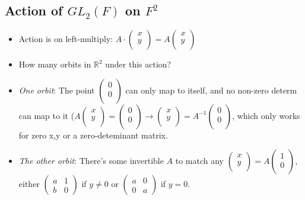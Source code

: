 \documentclass[11pt, oneside]{article}   	%
\begin{document}
\subsection{Action of $GL_2(F)$ on $F^2$}
\begin{itemize}
\item Action is on left-multiply: $A \cdot \begin{pmatrix} x \\ y \\ \end{pmatrix} = A \begin{pmatrix} x \\  y \\ \end{pmatrix}$
\item How many orbits in $\mathbb{R}^2$ under this action? 
\item  \emph{One orbit}: The point $\begin{pmatrix} 0 \\  0 \\ \end{pmatrix}$ can only map to itself, and no non-zero determ can map to it ($A \begin{pmatrix} x \\  y \\ \end{pmatrix} = \begin{pmatrix} 0 \\  0 \\ \end{pmatrix} \rightarrow \begin{pmatrix} x \\  y \\ \end{pmatrix} =  A^{-1} \begin{pmatrix} 0 \\  0 \\ \end{pmatrix}$, which only works for zero x,y or a zero-deteminant matrix.
\item \emph{The other orbit}: There's some invertible $A$ to match any $\begin{pmatrix} x \\  y \\ \end{pmatrix} = A \begin{pmatrix} 1 \\ 0 \\ \end{pmatrix} $, either $\begin{pmatrix} a & 1 \\ b & 0 \end{pmatrix}$ if $y \neq 0$ or $\begin{pmatrix} a & 0 \\ 0 & a\end{pmatrix}$ if $y = 0$. 

\end{itemize}
\end{document}
